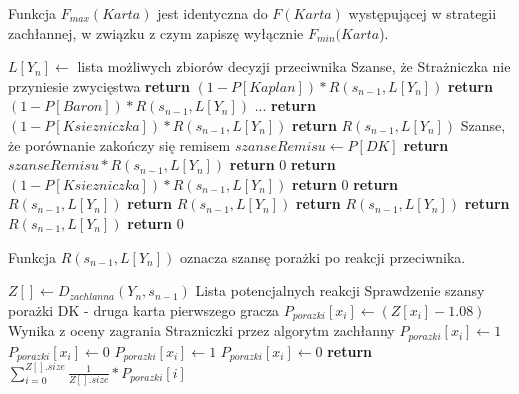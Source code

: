 Funkcja $F_{max}(Karta)$ jest identyczna do $F(Karta)$ występującej w strategii zachłannej, w związku z czym zapiszę wyłącznie $F_{min}(Karta$).
\begin{algorithmic}[1]
		\State $L[Y_n] \gets$ lista możliwych zbiorów decyzji przeciwnika 
			 \Comment Szanse, że Strażniczka nie przyniesie zwycięstwa
				\State \textbf{return} $ (1 - P[Kaplan]) * R(s_{n-1}, L[Y_n]) $
			\EndCase
				\State \textbf{return} $ (1 - P[Baron]) * R(s_{n-1}, L[Y_n]) $
			\EndCase
				\State ...
				\State \textbf{return} $ (1 - P[Ksiezniczka]) * R(s_{n-1}, L[Y_n]) $
			\EndCase
				\State \textbf{return} $  R(s_{n-1}, L[Y_n]) $
			\EndCase
				\Comment Szanse, że porównanie zakończy się remisem 
				\State $ szanseRemisu \gets P[DK]$ 
				\State \textbf{return} $ szanseRemisu * R(s_{n-1}, L[Y_n]) $
			\EndCase
				\State \textbf{return} $ 0 $
			\EndCase
				\State \textbf{return} $ (1 - P[Ksiezniczka]) * R(s_{n-1}, L[Y_n]) $
			\EndCase
					\State \textbf{return} $ 0 $
				\Else
					\State \textbf{return} $ R(s_{n-1}, L[Y_n]) $
				\EndIf
			\EndCase
				\State \textbf{return} $ R(s_{n-1}, L[Y_n]) $
			\EndCase
				\State \textbf{return} $ R(s_{n-1}, L[Y_n]) $
			\EndCase
				\State \textbf{return} $ R(s_{n-1}, L[Y_n]) $
			\EndCase
			\State \textbf{return} $ 0 $
			\EndCase
		\EndSwitch
	\EndFunction
\end{algorithmic}

Funkcja $R(s_{n-1}, L[Y_n])$ oznacza szansę porażki po reakcji przeciwnika.
\begin{algorithmic}[1]
			\State $Z[] \gets D_{zachlanna}(Y_n, s_{n-1}) $	\Comment Lista potencjalnych reakcji
		\EndFor
			\Comment Sprawdzenie szansy porażki
					\Comment DK - druga karta pierwszego gracza
					\State $P_{porazki}[x_i] \gets (Z[x_i] - 1.08)$ \Comment Wynika z oceny zagrania Strazniczki przez algorytm zachłanny
				\EndCase
						\State $P_{porazki}[x_i] \gets 1$
					\Else
						\State $P_{porazki}[x_i] \gets 0$
					\EndIf
				\EndCase
						\State $P_{porazki}[x_i] \gets 1$
					\Else
						\State $P_{porazki}[x_i] \gets 0$
					\EndIf
				\EndCase
			\EndSwitch
		\EndFor
		\State \textbf{return} $ \sum_{i=0}^{Z[].size} \frac{1}{Z[].size} * P_{porazki}[i] $
	\EndFunction
\end{algorithmic}


